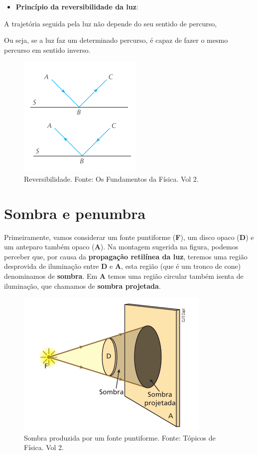 \documentclass[11pt,twocolumn,oneside]{article}
\begin{document}
\begin{itemize}

\item \textbf{Princípio da reversibilidade da luz}:

\end{itemize}


A trajetória seguida pela luz não depende do seu sentido de percurso,


Ou seja, se a luz faz um determinado percurso, é capaz de fazer o mesmo percurso em sentido inverso.


\begin{figure}[h]{}
\centering\includegraphics[width=2.5truein]{img17.png}
\caption{Reversibilidade. Fonte: Os Fundamentos da Física. Vol 2.}
\centering
\end{figure}

\hypertarget{x-sombra-e-penumbra}{\section{Sombra e penumbra}}
Primeiramente, vamos considerar um fonte puntiforme (\textbf{F}), um disco opaco (\textbf{D}) e um anteparo também opaco (\textbf{A}). Na montagem sugerida na figura, podemos perceber que, por causa da \textbf{propagação retilínea da luz}, teremos uma região desprovida de iluminação entre \textbf{D} e \textbf{A}, esta região (que é um tronco de cone) denominamos de \textbf{sombra}. Em \textbf{A} temos uma região circular também isenta de iluminação, que chamamos de \textbf{sombra projetada}.


\begin{figure}[h]{}
\centering\includegraphics[width=2.5truein]{img18.png}
\caption{Sombra produzida por um fonte puntiforme. Fonte: Tópicos de Física. Vol 2.}
\centering
\end{figure}
\end{document}
